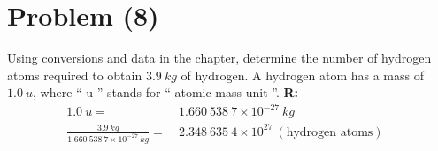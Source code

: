 \section{Problem (8)}
	Using conversions and data in the chapter, determine the number of hydrogen atoms required to obtain $3.9 \ kg$ of hydrogen. A hydrogen atom has a mass of $1.0 \ u$, where `` u '' stands for `` atomic mass unit ''. \newline
	\textbf{R:} \newline
	\begin{align}
		1.0 \ u = \ & 1.660 \ 538 \ 7 \times 10^{-27} \ kg \\
		\frac{3.9 \ kg}{1.660 \ 538 \ 7 \times 10^{-27} \ kg}
		= \ & 2.348 \ 635 \ 4 \times 10^{27} \ (\text{hydrogen atoms})&
	\end{align}
